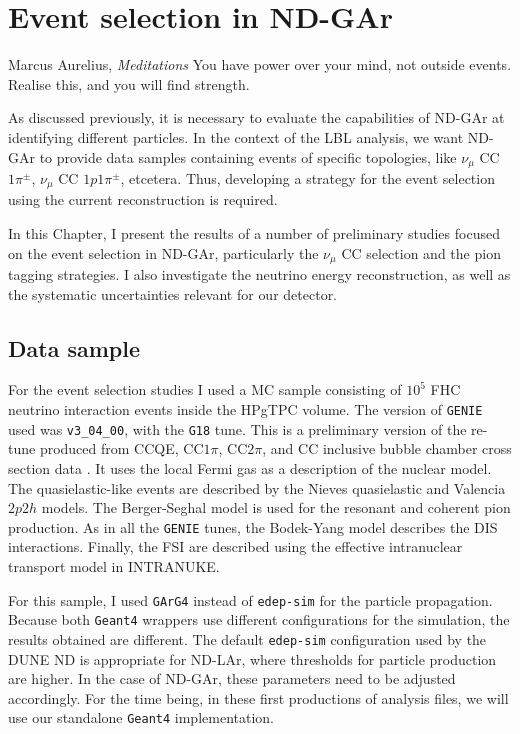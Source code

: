 \chapter{Event selection in ND-GAr}
\label{chapter:gar_selection}

\begin{chapquote}{Marcus Aurelius, \textit{Meditations}}
	You have power over your mind, not outside events. Realise this, and you will find strength.
\end{chapquote}

As discussed previously, it is necessary to evaluate the capabilities of ND-GAr at identifying different particles. In the context of the LBL analysis, we want ND-GAr to provide data samples containing events of specific topologies, like $\nu_{\mu}$ CC $1\pi^{\pm}$, $\nu_{\mu}$ CC $1p1\pi^{\pm}$, etcetera. Thus, developing a strategy for the event selection using the current reconstruction is required.

In this Chapter, I present the results of a number of preliminary studies focused on the event selection in ND-GAr, particularly the $\nu_{\mu}$ CC selection and the pion tagging strategies. I also investigate the neutrino energy reconstruction, as well as the systematic uncertainties relevant for our detector.

\section{Data sample}

For the event selection studies I used a MC sample consisting of $10^{5}$ FHC neutrino interaction events inside the HPgTPC volume. The version of \texttt{GENIE} used was \texttt{v3_04_00}, with the \texttt{G18} tune. This is a preliminary version of the re-tune produced from CCQE, CC$1\pi$, CC$2\pi$, and CC inclusive bubble chamber cross section data \cite{GENIE2021}. It uses the local Fermi gas as a description of the nuclear model. The quasielastic-like events are described by the Nieves quasielastic \cite{Nieves2004} and Valencia $2p2h$ \cite{Nieves2011} models. The Berger-Seghal model \cite{Berger2007,Berger2008} is used for the resonant and coherent pion production. As in all the \texttt{GENIE} tunes, the Bodek-Yang model \cite{Bodek2002} describes the DIS interactions. Finally, the FSI are described using the effective intranuclear transport model in INTRANUKE.

For this sample, I used \texttt{GArG4} instead of \texttt{edep-sim} for the particle propagation. Because both \texttt{Geant4} wrappers use different configurations for the simulation, the results obtained are different. The default \texttt{edep-sim} configuration used by the DUNE ND is appropriate for ND-LAr, where thresholds for particle production are higher. In the case of ND-GAr, these parameters need to be adjusted accordingly. For the time being, in these first productions of analysis files, we will use our standalone \texttt{Geant4} implementation.

